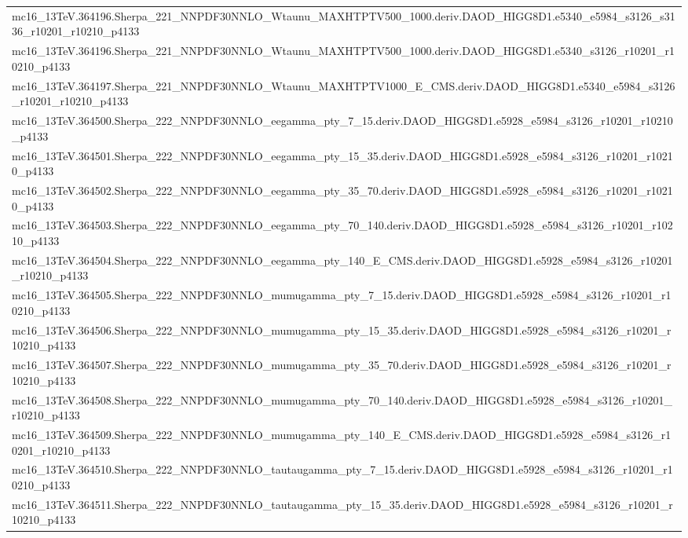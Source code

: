 \begin{adjustwidth}{-3em}{-3em}
\begin{longtable}{l}
mc16\_13TeV.364196.Sherpa\_221\_NNPDF30NNLO\_Wtaunu\_MAXHTPTV500\_1000.deriv.DAOD\_HIGG8D1.e5340\_e5984\_s3126\_s3136\_r10201\_r10210\_p4133 \\
mc16\_13TeV.364196.Sherpa\_221\_NNPDF30NNLO\_Wtaunu\_MAXHTPTV500\_1000.deriv.DAOD\_HIGG8D1.e5340\_s3126\_r10201\_r10210\_p4133 \\
mc16\_13TeV.364197.Sherpa\_221\_NNPDF30NNLO\_Wtaunu\_MAXHTPTV1000\_E\_CMS.deriv.DAOD\_HIGG8D1.e5340\_e5984\_s3126\_r10201\_r10210\_p4133 \\
mc16\_13TeV.364500.Sherpa\_222\_NNPDF30NNLO\_eegamma\_pty\_7\_15.deriv.DAOD\_HIGG8D1.e5928\_e5984\_s3126\_r10201\_r10210\_p4133 \\
mc16\_13TeV.364501.Sherpa\_222\_NNPDF30NNLO\_eegamma\_pty\_15\_35.deriv.DAOD\_HIGG8D1.e5928\_e5984\_s3126\_r10201\_r10210\_p4133 \\
mc16\_13TeV.364502.Sherpa\_222\_NNPDF30NNLO\_eegamma\_pty\_35\_70.deriv.DAOD\_HIGG8D1.e5928\_e5984\_s3126\_r10201\_r10210\_p4133 \\
mc16\_13TeV.364503.Sherpa\_222\_NNPDF30NNLO\_eegamma\_pty\_70\_140.deriv.DAOD\_HIGG8D1.e5928\_e5984\_s3126\_r10201\_r10210\_p4133 \\
mc16\_13TeV.364504.Sherpa\_222\_NNPDF30NNLO\_eegamma\_pty\_140\_E\_CMS.deriv.DAOD\_HIGG8D1.e5928\_e5984\_s3126\_r10201\_r10210\_p4133 \\
mc16\_13TeV.364505.Sherpa\_222\_NNPDF30NNLO\_mumugamma\_pty\_7\_15.deriv.DAOD\_HIGG8D1.e5928\_e5984\_s3126\_r10201\_r10210\_p4133 \\
mc16\_13TeV.364506.Sherpa\_222\_NNPDF30NNLO\_mumugamma\_pty\_15\_35.deriv.DAOD\_HIGG8D1.e5928\_e5984\_s3126\_r10201\_r10210\_p4133 \\
mc16\_13TeV.364507.Sherpa\_222\_NNPDF30NNLO\_mumugamma\_pty\_35\_70.deriv.DAOD\_HIGG8D1.e5928\_e5984\_s3126\_r10201\_r10210\_p4133 \\
mc16\_13TeV.364508.Sherpa\_222\_NNPDF30NNLO\_mumugamma\_pty\_70\_140.deriv.DAOD\_HIGG8D1.e5928\_e5984\_s3126\_r10201\_r10210\_p4133 \\
mc16\_13TeV.364509.Sherpa\_222\_NNPDF30NNLO\_mumugamma\_pty\_140\_E\_CMS.deriv.DAOD\_HIGG8D1.e5928\_e5984\_s3126\_r10201\_r10210\_p4133 \\
mc16\_13TeV.364510.Sherpa\_222\_NNPDF30NNLO\_tautaugamma\_pty\_7\_15.deriv.DAOD\_HIGG8D1.e5928\_e5984\_s3126\_r10201\_r10210\_p4133 \\
mc16\_13TeV.364511.Sherpa\_222\_NNPDF30NNLO\_tautaugamma\_pty\_15\_35.deriv.DAOD\_HIGG8D1.e5928\_e5984\_s3126\_r10201\_r10210\_p4133 \\

\end{longtable}
\end{adjustwidth}

